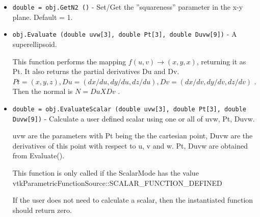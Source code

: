 \begin{itemize}
\item  \verb|double = obj.GetN2 ()| -   Set/Get the ''squareness'' parameter in the x-y plane. Default = 1.

\item  \verb|obj.Evaluate (double uvw[3], double Pt[3], double Duvw[9])| -  A superellipsoid.

 This function performs the mapping $f(u,v) \rightarrow (x,y,x)$, returning it
 as Pt. It also returns the partial derivatives Du and Dv.
 $Pt = (x, y, z), Du = (dx/du, dy/du, dz/du), Dv = (dx/dv, dy/dv, dz/dv)$ .
 Then the normal is $N = Du X Dv$ .

\item  \verb|double = obj.EvaluateScalar (double uvw[3], double Pt[3], double Duvw[9])| -  Calculate a user defined scalar using one or all of uvw, Pt, Duvw.

 uvw are the parameters with Pt being the the cartesian point, 
 Duvw are the derivatives of this point with respect to u, v and w.
 Pt, Duvw are obtained from Evaluate().

 This function is only called if the ScalarMode has the value
 vtkParametricFunctionSource::SCALAR\_FUNCTION\_DEFINED

 If the user does not need to calculate a scalar, then the 
 instantiated function should return zero. 


\end{itemize}
